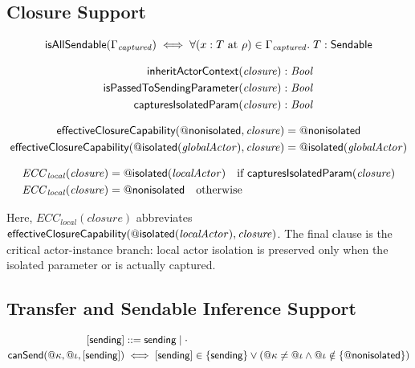 \subsection{Closure Support}

\[
  \textsf{isAllSendable}(\Gamma_{\mathit{captured}})
    \iff \forall (x : T \text{ at } \rho) \in \Gamma_{\mathit{captured}}.\; T : \textsf{Sendable}
\]

\[
\begin{aligned}
  \textsf{inheritActorContext}(\mathit{closure}) &: \mathit{Bool} \\
  \textsf{isPassedToSendingParameter}(\mathit{closure}) &: \mathit{Bool} \\
  \textsf{capturesIsolatedParam}(\mathit{closure}) &: \mathit{Bool}
\end{aligned}
\]

\[
\begin{aligned}
  \textsf{effectiveClosureCapability}(@\textsf{nonisolated}, \mathit{closure}) &= @\textsf{nonisolated} \\
  \textsf{effectiveClosureCapability}(@\textsf{isolated}(\mathit{globalActor}), \mathit{closure}) &= @\textsf{isolated}(\mathit{globalActor})
\end{aligned}
\]

\[
\begin{aligned}
  \mathit{ECC}_{\mathit{local}}(\mathit{closure})
    &= @\textsf{isolated}(\mathit{localActor})
      \quad \text{if } \textsf{capturesIsolatedParam}(\mathit{closure}) \\
  \mathit{ECC}_{\mathit{local}}(\mathit{closure})
    &= @\textsf{nonisolated}
      \quad \text{otherwise}
\end{aligned}
\]

Here, $\mathit{ECC}_{\mathit{local}}(\mathit{closure})$ abbreviates $\textsf{effectiveClosureCapability}(@\textsf{isolated}(\mathit{localActor}), \mathit{closure})$. The final clause is the critical actor-instance branch: local actor isolation is preserved only when the isolated parameter or  is actually captured.

\subsection{Transfer and Sendable Inference Support}

\[
\begin{aligned}
  [\sending] &::= \sending \mid \cdot \\
  \canSend(@\kappa, @\iota, [\sending]) &\iff [\sending] \in \{\sending\} \lor (@\kappa \neq @\iota \land @\iota \notin \{@\textsf{nonisolated}\})
\end{aligned}
\]

